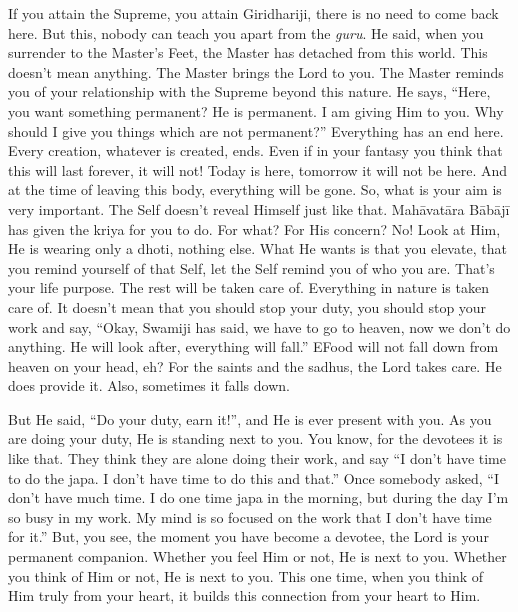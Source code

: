 If you attain the Supreme, you attain Giridhariji, there is no need to come back here. But this, nobody can teach you apart from the \textit{guru}. He said, when you surrender to the Master’s Feet, the Master has detached from this world. This doesn’t mean anything. The Master brings the Lord to you. The Master reminds you of your relationship with the Supreme beyond this nature. He says, “Here, you want something permanent? He is permanent. I am giving Him to you. Why should I give you things which are not permanent?” Everything has an end here. Every creation, whatever is created, ends. Even if in your fantasy you think that this will last forever, it will not! Today is here, tomorrow it will not be here. And at the time of leaving this body, everything will be gone. So, what is your aim is very important. The Self doesn’t reveal Himself just like that. Mahāvatāra Bābājī has given the kriya for you to do. For what? For His concern? No! Look at Him, He is wearing only a dhoti, nothing else. What He wants is that you elevate, that you remind yourself of that Self, let the Self remind you of who you are. That’s your life purpose. The rest will be taken care of. Everything in nature is taken care of. It doesn’t mean that you should stop your duty, you should stop your work and say, “Okay, Swamiji has said, we have to go to heaven, now we don’t do anything. He will look after, everything will fall.” EFood will not fall down from heaven on your head, eh? For the saints and the sadhus, the Lord takes care. He does provide it. Also, sometimes it falls down.

But He said, “Do your duty, earn it!”, and He is ever present with you. As you are doing your duty, He is standing next to you. You know, for the devotees it is like that. They think they are alone doing their work, and say “I don’t have time to do the japa. I don’t have time to do this and that.” Once somebody asked, “I don’t have much time. I do one time japa in the morning, but during the day I’m so busy in my work. My mind is so focused on the work that I don’t have time for it.” But, you see, the moment you have become a devotee, the Lord is your permanent companion. Whether you feel Him or not, He is next to you. Whether you think of Him or not, He is next to you. This one time, when you think of Him truly from your heart, it builds this connection from your heart to Him.

